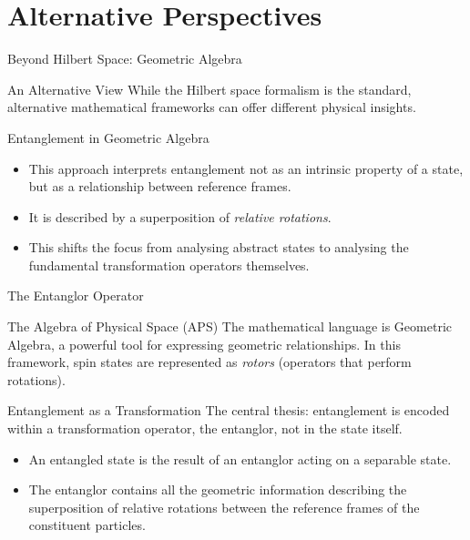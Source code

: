 
\section{Alternative Perspectives}


\begin{frame}{Beyond Hilbert Space: Geometric Algebra}
  \begin{block}{An Alternative View}
    While the Hilbert space formalism is the standard, alternative mathematical
    frameworks can offer different physical insights.
  \end{block}
  \pause
  \begin{alertblock}{Entanglement in Geometric Algebra}
    \begin{itemize}
      \item This approach interprets entanglement not as an intrinsic property
        of a state, but as a relationship between reference frames.
        \pause
      \item It is described by a superposition of \emph{relative rotations}.
        \pause
      \item This shifts the focus from analysing abstract states to analysing
        the fundamental transformation operators themselves.
    \end{itemize}
  \end{alertblock}
\end{frame}

\begin{frame}{The Entanglor Operator}
  \begin{block}{The Algebra of Physical Space (APS)}
    The mathematical language is Geometric Algebra, a powerful tool for
    expressing geometric relationships. In this framework, spin states are
    represented as \emph{rotors} (operators that perform rotations).
  \end{block}
  \pause
  \begin{alertblock}{Entanglement as a Transformation}
    The central thesis: entanglement is encoded within a transformation
    operator, the \alert{entanglor}, not in the state itself.
    \begin{itemize}
      \item An entangled state is the result of an entanglor acting on a
        separable state.
      \item The entanglor contains all the geometric information describing the
        superposition of relative rotations between the reference frames of the
        constituent particles.
    \end{itemize}
  \end{alertblock}
\end{frame}

